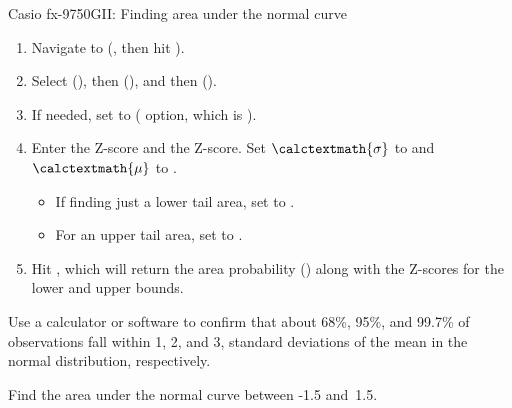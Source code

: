 \begin{onebox}{ Casio fx-9750GII: Finding area under the normal curve}
\begin{enumerate}
\setlength{\itemsep}{0mm}
\item Navigate to  (, then hit ).
\item Select  (), then  (), and then  ().
\item If needed, set  to  ( option, which is ).
\item Enter the  Z-score and the  Z-score. Set $\calctextmath{\sigma}$ to  and $\calctextmath{\mu}$ to .\vspace{-1.5mm}
  \begin{itemize}
  \setlength{\itemsep}{0mm}
  \item If finding just a lower tail area, set  to .
  \item For an upper tail area, set  to .
  \end{itemize}
\item Hit , which will return the area probability () along with the Z-scores for the lower and upper bounds.
\end{enumerate}
\end{onebox}


\begin{exercisewrap}
\begin{nexercise}
Use a calculator or software to confirm that about 68\%, 95\%, and 99.7\% of observations fall within 1, 2, and 3, standard deviations of the mean in the normal distribution, respectively.\footnotemark
\end{nexercise}
\end{exercisewrap}

\begin{exercisewrap}
\begin{nexercise}Find the area under the normal curve between -1.5 and~1.5.~\footnotemark\end{nexercise}
\end{exercisewrap}


